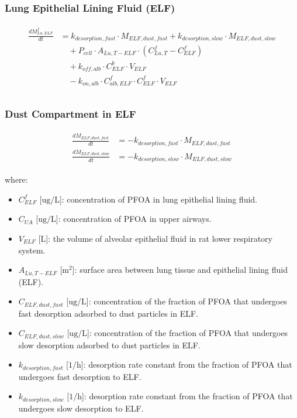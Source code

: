 \documentclass[preprint,12pt,authoryear]{elsarticle}
\begin{document}
\subsubsection{Lung Epithelial Lining Fluid (ELF)}

\begin{align}
\begin{aligned}
\frac{dM_{Lu,ELF}^f}{dt} &=  k_{desorption,fast} \cdot M_{ELF,dust,fast} + k_{desorption,slow} \cdot M_{ELF,dust,slow}
\\
& \quad + P_{cell} \cdot A_{Lu,T-ELF} \cdot (C_{Lu,T}^f - C_{ELF}^f) \\
& \quad + k_{off,alb} \cdot C_{ELF}^b \cdot V_{ELF}
\\
& \quad - k_{on,alb} \cdot C_{alb,ELF}^f \cdot C_{ELF}^f \cdot V_{ELF} \\
\end{aligned}
\label{eq:PFOA_lung_ELF}
\end{align}

\subsubsection{Dust Compartment in ELF}

\begin{align}
\begin{aligned}
\frac{dM_{ELF,dust,fast}}{dt} &= - k_{desorption,fast} \cdot M_{ELF,dust,fast}\\
\frac{dM_{ELF,dust,slow}}{dt} &= - k_{desorption,slow} \cdot M_{ELF,dust,slow}
\end{aligned}
\label{eq:PFOA_dust_deposition2}
\end{align}



\noindent
where:
\begin{itemize}
 
    \item $C_{ELF}^f$ [$\text{ug}/\text{L}$]: concentration of PFOA in lung epithelial lining fluid.
    \item $C_{UA}$ [$\text{ug}/\text{L}$]: concentration of PFOA in upper airways.
    \item $V_{ELF}$ [$\text{L}$]: the volume of alveolar epithelial fluid in rat lower respiratory system.
    \item $A_{Lu,T-ELF}$ [$\text{m}^2$]: surface area between lung tissue and epithelial lining fluid (ELF).
    \item $C_{ELF,dust,fast}$ [$\text{ug}/\text{L}$]: concentration of the fraction of PFOA that undergoes fast desorption adsorbed to dust particles in ELF.
    \item $C_{ELF,dust,slow}$ [$\text{ug}/\text{L}$]: concentration of the fraction of PFOA that undergoes slow desorption adsorbed to dust particles in ELF.
    \item $k_{desorption, fast}$ [$1/\text{h}$]: desorption rate constant from the fraction of PFOA that undergoes fast desorption to ELF.
    \item $k_{desorption, slow}$ [$1/\text{h}$]: desorption rate constant from the fraction of PFOA that undergoes slow desorption to ELF.
\end{itemize}
\end{document}
